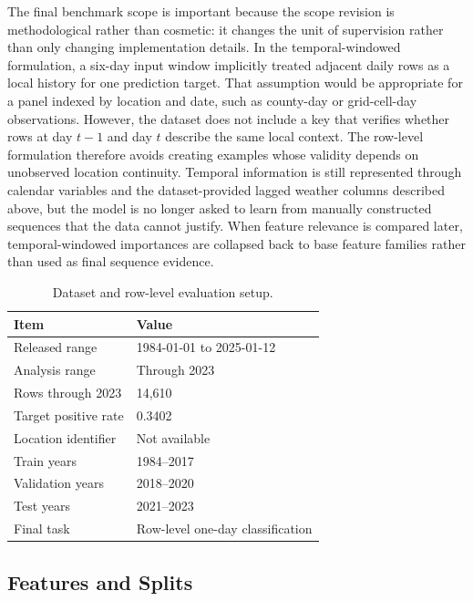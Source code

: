 \documentclass{article}
\begin{document}
The final benchmark scope is important because the scope revision is methodological rather than cosmetic: it changes the unit of supervision rather than only changing implementation details. In the temporal-windowed formulation, a six-day input window implicitly treated adjacent daily rows as a local history for one prediction target. That assumption would be appropriate for a panel indexed by location and date, such as county-day or grid-cell-day observations. However, the dataset does not include a key that verifies whether rows at day $t-1$ and day $t$ describe the same local context. The row-level formulation therefore avoids creating examples whose validity depends on unobserved location continuity. Temporal information is still represented through calendar variables and the dataset-provided lagged weather columns described above, but the model is no longer asked to learn from manually constructed sequences that the data cannot justify. When feature relevance is compared later, temporal-windowed importances are collapsed back to base feature families rather than used as final sequence evidence.

\begin{table}[t]
\caption{Dataset and row-level evaluation setup.}
\label{tab:data_split}
\vskip 0.03in
\begin{center}
\begin{small}
\begin{tabular}{ll}
\toprule
Item & Value \\
\midrule
Released range & 1984-01-01 to 2025-01-12 \\
Analysis range & Through 2023 \\
Rows through 2023 & 14,610 \\
Target positive rate & 0.3402 \\
Location identifier & Not available \\
Train years & 1984--2017 \\
Validation years & 2018--2020 \\
Test years & 2021--2023 \\
Final task & Row-level one-day classification \\
\bottomrule
\end{tabular}
\end{small}
\end{center}
\vskip -0.24in
\end{table}

\subsection{Features and Splits}
\end{document}
